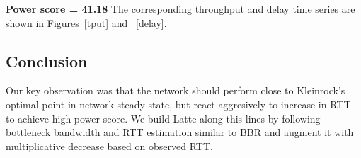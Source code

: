 \documentclass{article}
\begin{document}
\textbf{Power score = 41.18}
The corresponding throughput and delay time series are shown in
Figures~\ref{tput} and ~\ref{delay}.

\subsection{Conclusion} Our key observation was that the network
should perform close to Kleinrock's optimal point in network steady
state, but react aggresively to increase in RTT to achieve high power
score. We build Latte along this lines by following bottleneck
bandwidth and RTT estimation similar to BBR and augment it with
multiplicative decrease based on observed RTT.
\end{document}
